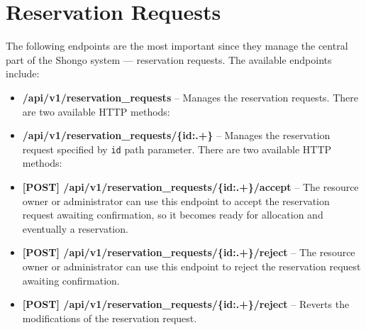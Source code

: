 \section{Reservation Requests}
The following endpoints are the most important since they manage the central part of the Shongo system --- reservation requests.
The available endpoints include:
\begin{itemize}
    \item \textbf{/api/v1/reservation\_requests} -- Manages the reservation requests. There are two available HTTP methods:
    \item \textbf{/api/v1/reservation\_requests/\{id:.+\}} -- Manages the reservation request specified by \texttt{id} path parameter. There are two available HTTP methods:
    \item \textbf{[POST] /api/v1/reservation\_requests/\{id:.+\}/accept} -- The resource owner or administrator can use this endpoint to accept the reservation request awaiting confirmation, so it becomes ready for allocation and eventually a reservation.
    \item \textbf{[POST] /api/v1/reservation\_requests/\{id:.+\}/reject} -- The resource owner or administrator can use this endpoint to reject the reservation request awaiting confirmation.
    \item \textbf{[POST] /api/v1/reservation\_requests/\{id:.+\}/reject} -- Reverts the modifications of the reservation request.
\end{itemize}



